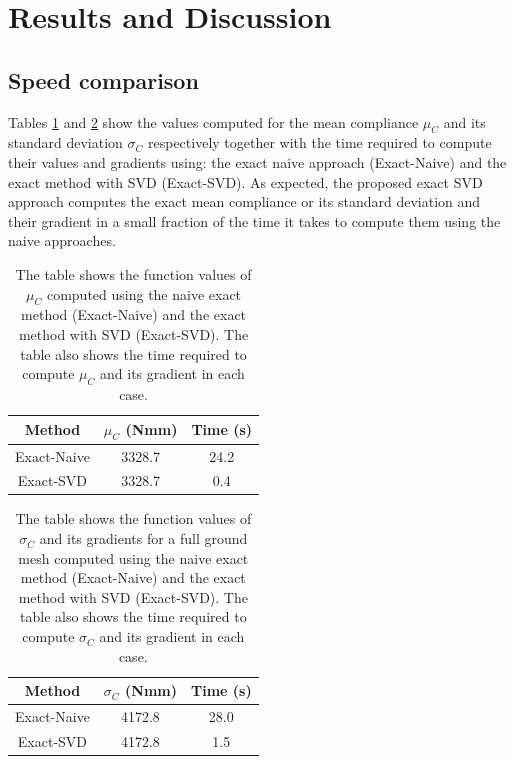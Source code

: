 \section{Results and Discussion} \label{sec:results}

  \subsection{Speed comparison}

    Tables \ref{tab:time_mean} and \ref{tab:time_std} show the values computed for the mean compliance $\mu_C$ and its standard deviation $\sigma_C$ respectively together with the time required to compute their values and gradients using: the exact naive approach (Exact-Naive) and the exact method with SVD (Exact-SVD). As expected, the proposed exact SVD approach computes the exact mean compliance or its standard deviation and their gradient in a small fraction of the time it takes to compute them using the naive approaches.

    \begin{table}[h!]
     \centering
     \caption{The table shows the function values of $\mu_C$ computed using the naive exact method (Exact-Naive) and the exact method with SVD (Exact-SVD). The table also shows the time required to compute $\mu_C$ and its gradient in each case.}
     \begin{tabular}{|c|c|c|}
      \hline
      Method & $\mu_C$ (Nmm) & Time (s) \\
      \hline
      \hline
      Exact-Naive & 3328.7 & 24.2 \\
      \hline
      Exact-SVD & 3328.7 & 0.4 \\
      \hline
     \end{tabular}
     \label{tab:time_mean}
    \end{table}

    \begin{table}[h!]
     \centering
     \caption{The table shows the function values of $\sigma_C$ and its gradients for a full ground mesh computed using the naive exact method (Exact-Naive) and the exact method with SVD (Exact-SVD). The table also shows the time required to compute $\sigma_C$ and its gradient in each case.}
     \begin{tabular}{|c|c|c|}
      \hline
      Method & $\sigma_C$ (Nmm) & Time (s) \\
      \hline
      \hline
      Exact-Naive & 4172.8 & 28.0 \\
      \hline
      Exact-SVD & 4172.8 & 1.5 \\
      \hline
     \end{tabular}
     \label{tab:time_std}
    \end{table}

